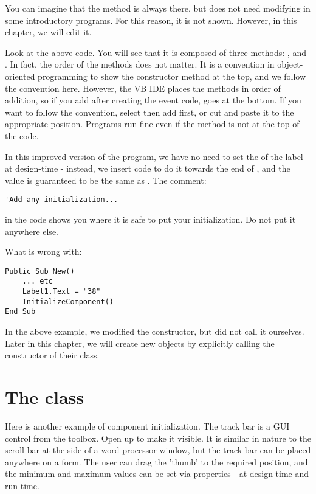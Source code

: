 		You can imagine that the  method is always there, but does not need modifying in some introductory programs. For this reason, it is not shown. However, in this 
chapter, we will edit it.
		
		Look at the above code. You will see that it is composed of three methods: ,  and . In fact, the order of the methods does not matter. It is a convention in object-oriented programming to show the constructor method at the top, and we follow the convention here. However, the VB IDE places the methods in order of addition, so if you add  after creating the event code,  goes at the bottom. If you want to follow the convention, select  then add  first, or cut and paste it to the appropriate position. Programs run fine even if the  method is not at the top of the code.

		In this improved version of the program, we have no need to set the  of the label at design-time - instead, we insert code to do it towards the end of , and the value is guaranteed to be the same as . The comment:
		\begin{lstlisting}
'Add any initialization...
		\end{lstlisting}
		in the code shows you where it is safe to put your initialization. Do not put it anywhere else.
		
		\begin{stqb}
			\begin{STQ}
				\item	What is wrong with:
					\begin{lstlisting}
Public Sub New()
	... etc
	Label1.Text = "38"
	InitializeComponent()
End Sub
					\end{lstlisting}
			\end{STQ}
		\end{stqb}
		In the above example, we modified the  constructor, but did not call it ourselves. Later in this chapter, we will create new objects by explicitly calling the constructor of their class.


  \section{The  class}
		Here is another example of component initialization. The track bar is a GUI control from the toolbox. Open up  to make it visible. It is similar in nature to the scroll bar at the side of a word-processor window, but the track bar can be placed anywhere on a form. The user can drag the 'thumb' to the required position, and the minimum and maximum values can be set via properties - at design-time and run-time.
		
